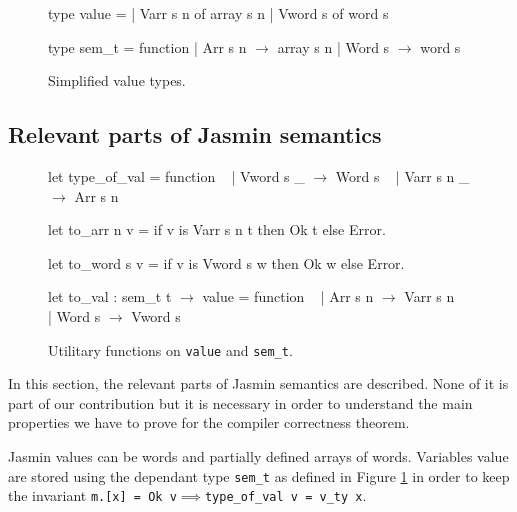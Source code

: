 \documentclass{article}
\begin{document}
\begin{figure}[t]
\obeylines\obeyspaces\ttfamily%
type value =
| Varr s n of array s n
| Vword s  of word  s

type sem\_t = function
| Arr s n \(\rightarrow\) array s n
| Word s  \(\rightarrow\) word  s
\normalfont%
\caption{Simplified value types.}\label{fig:oldval}
\end{figure}

\subsection{Relevant parts of Jasmin semantics}

\begin{figure}[t]
\obeylines\obeyspaces\ttfamily%
let type\_of\_val = function
~ | Vword s  \_ \(\rightarrow\) Word s
~ | Varr s n \_ \(\rightarrow\) Arr s n

let to\_arr  n v = if v is Varr s n t then Ok t else Error.

let to\_word s v = if v is Vword s  w then Ok w else Error.

let to\_val : sem\_t t \(\rightarrow\) value = function
~ | Arr s n \(\rightarrow\) Varr s n
~ | Word s  \(\rightarrow\) Vword s
\normalfont%
\caption{Utilitary functions on \texttt{value} and \texttt{sem\_t}.}\label{fig:oldvfun}
\end{figure}

In this section, the relevant parts of Jasmin semantics are described. None of
it is part of our contribution but it is necessary in order to understand
the main properties we have to prove for the compiler correctness theorem.


Jasmin values can be words and partially defined arrays of words. Variables value
are stored using the dependant type \texttt{sem\_t} as defined in Figure
\ref{fig:oldval} in order to keep the invariant
\texttt{m.[x] = Ok v\(\implies\)type\_of\_val v = v\_ty x}.

\medskip
\end{document}
